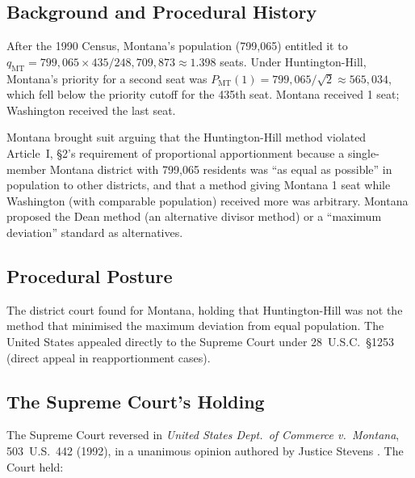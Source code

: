 \label{sec:montana}

\subsection{Background and Procedural History}

After the 1990 Census, Montana's population (799{,}065) entitled it to
$q_{\text{MT}} = 799{,}065 \times 435 / 248{,}709{,}873 \approx 1.398$ seats.
Under Huntington-Hill, Montana's priority for a second seat was
$P_{\text{MT}}(1) = 799{,}065/\sqrt{2} \approx 565{,}034$,
which fell below the priority cutoff for the 435th seat.
Montana received 1 seat; Washington received the last seat.

Montana brought suit arguing that the Huntington-Hill method violated
Article~I, \S2's requirement of proportional apportionment because
a single-member Montana district with 799{,}065 residents was
``as equal as possible'' in population to other districts, and that
a method giving Montana 1 seat while Washington (with comparable
population) received more was arbitrary.
Montana proposed the Dean method (an alternative divisor method)
or a ``maximum deviation'' standard as alternatives.

\subsection{Procedural Posture}

The district court found for Montana, holding that Huntington-Hill
was not the method that minimised the maximum deviation from equal
population.
The United States appealed directly to the Supreme Court under
28~U.S.C.\ \S1253 (direct appeal in reapportionment cases).

\subsection{The Supreme Court's Holding}

The Supreme Court reversed in \textit{United States Dept.\ of Commerce v.\
Montana}, 503~U.S.\ 442 (1992), in a unanimous opinion authored by
Justice Stevens \citep{montana1992}.
The Court held:

